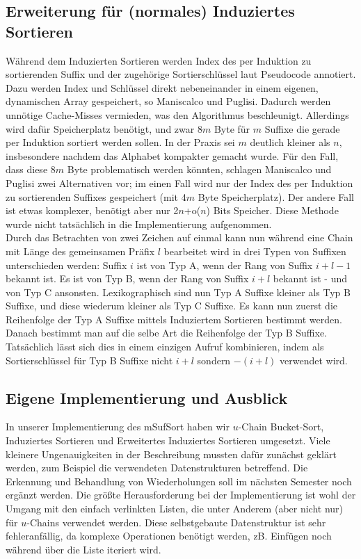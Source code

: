 \subsection{Erweiterung für (normales) Induziertes Sortieren}
Während dem Induzierten Sortieren werden Index des per Induktion zu sortierenden Suffix und der zugehörige Sortierschlüssel laut Pseudocode annotiert. Dazu werden Index und Schlüssel direkt nebeneinander in einem eigenen, dynamischen Array gespeichert, so Maniscalco und Puglisi. Dadurch werden unnötige Cache-Misses vermieden, was den Algorithmus beschleunigt. Allerdings wird dafür Speicherplatz benötigt, und zwar 8$m$ Byte für $m$ Suffixe die gerade per Induktion sortiert werden sollen. In der Praxis sei $m$ deutlich kleiner als $n$, insbesondere nachdem das Alphabet kompakter gemacht wurde.
Für den Fall, dass diese 8$m$ Byte problematisch werden könnten, schlagen Maniscalco und Puglisi zwei Alternativen vor; im einen Fall wird nur der Index des per Induktion zu sortierenden Suffixes gespeichert (mit 4$m$ Byte Speicherplatz). Der andere Fall ist etwas komplexer, benötigt aber nur 2$n$+o($n$) Bits Speicher. Diese Methode wurde nicht tatsächlich in die Implementierung aufgenommen.\\
Durch das Betrachten von zwei Zeichen auf einmal kann nun während eine Chain mit Länge des gemeinsamen Präfix $l$ bearbeitet wird in drei Typen von Suffixen unterschieden werden: Suffix $i$ ist von Typ A, wenn der Rang von Suffix $i+l-1$ bekannt ist. Es ist von Typ B, wenn der Rang von Suffix $i+l$ bekannt ist - und von Typ C ansonsten. Lexikographisch sind nun Typ A Suffixe kleiner als Typ B Suffixe, und diese wiederum kleiner als Typ C Suffixe. Es kann nun zuerst die Reihenfolge der Typ A Suffixe mittels Induziertem Sortieren bestimmt werden. Danach bestimmt man auf die selbe Art die Reihenfolge der Typ B Suffixe. Tatsächlich lässt sich dies in einem einzigen Aufruf kombinieren, indem als Sortierschlüssel für Typ B Suffixe nicht $i+l$ sondern $-(i+l)$ verwendet wird.

\subsection{Eigene Implementierung und Ausblick}
In unserer Implementierung des mSufSort haben wir $u$-Chain Bucket-Sort, Induziertes Sortieren und Erweitertes Induziertes Sortieren umgesetzt. Viele kleinere Ungenauigkeiten in der Beschreibung mussten dafür zunächst geklärt werden, zum Beispiel die verwendeten Datenstrukturen betreffend.
Die Erkennung und Behandlung von Wiederholungen soll im nächsten Semester noch ergänzt werden.
Die größte Herausforderung bei der Implementierung ist wohl der Umgang mit den einfach verlinkten Listen, die unter Anderem (aber nicht nur) für $u$-Chains verwendet werden. Diese selbstgebaute Datenstruktur ist sehr fehleranfällig, da komplexe Operationen benötigt werden, zB. Einfügen noch während über die Liste iteriert wird.\\

